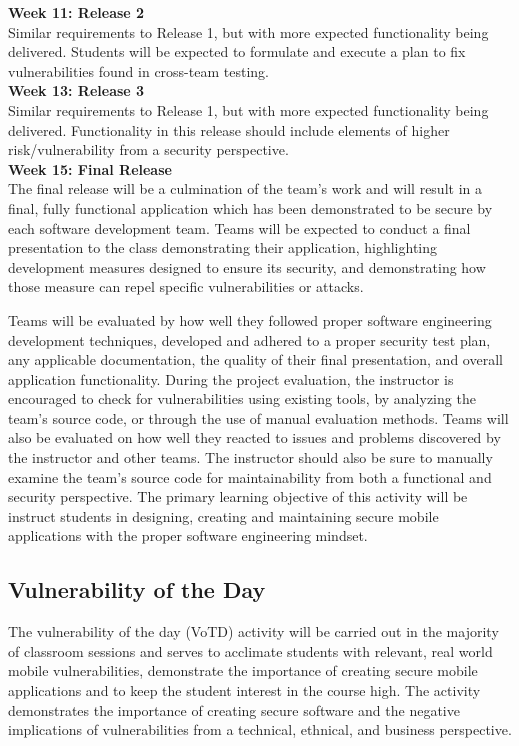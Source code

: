 \documentclass{sig-alternate}
\begin{document}
\textbf{Week 11: Release 2}\\
Similar requirements to Release 1, but with more expected functionality being delivered. Students will be expected to formulate and execute a plan to fix vulnerabilities found in cross-team testing. \\

\textbf{Week 13: Release 3}\\
Similar requirements to Release 1, but with more expected functionality being delivered. Functionality in this release should include elements of higher risk/vulnerability from a security perspective.\\

\textbf{Week 15: Final Release}\\
The final release will be a culmination of the team's work and will result in a final, fully functional application which has been demonstrated to be secure by each software development team. Teams will be expected to conduct a final presentation to the class demonstrating their application, highlighting development measures designed to ensure its security, and demonstrating how those measure can repel specific vulnerabilities or attacks.

Teams will be evaluated by how well they followed proper software engineering development techniques, developed and adhered to a proper security test plan, any applicable documentation, the quality of their final presentation, and overall application functionality. During the project evaluation, the instructor is encouraged to check for vulnerabilities using existing tools, by analyzing the team's source code, or through the use of manual evaluation methods. Teams will also be evaluated on how well they reacted to issues and problems discovered by the instructor and other teams. The instructor should also be sure to manually examine the team's source code for maintainability from both a functional and security perspective. The primary learning objective of this activity will be instruct students in designing, creating and maintaining secure mobile applications with the proper software engineering mindset.

\subsection{Vulnerability of the Day}

The vulnerability of the day (VoTD) activity will be carried out in the majority of classroom sessions and serves to acclimate students with relevant, real world mobile vulnerabilities, demonstrate the importance of creating secure mobile applications and to keep the student interest in the course high. The activity demonstrates the importance of creating secure software and the negative implications of vulnerabilities from a technical, ethnical, and business perspective.
\end{document}
